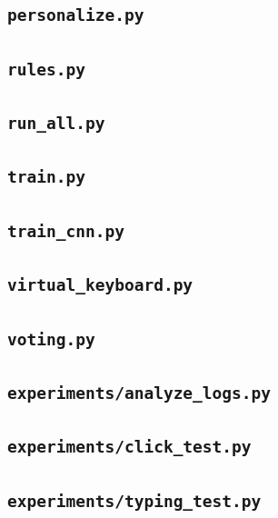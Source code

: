 \subsection*{\texttt{personalize.py}}

\subsection*{\texttt{rules.py}}

\subsection*{\texttt{run\_all.py}}

\subsection*{\texttt{train.py}}

\subsection*{\texttt{train\_cnn.py}}

\subsection*{\texttt{virtual\_keyboard.py}}

\subsection*{\texttt{voting.py}}

\subsection*{\texttt{experiments/analyze\_logs.py}}

\subsection*{\texttt{experiments/click\_test.py}}

\subsection*{\texttt{experiments/typing\_test.py}}

